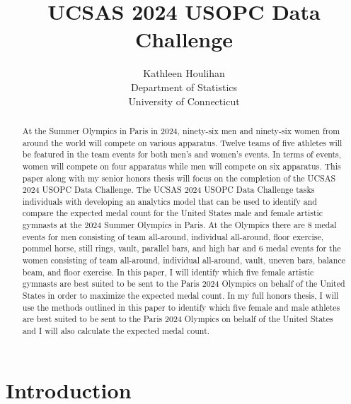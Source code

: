 \documentclass[12pt]{article}
\title{UCSAS 2024 USOPC Data Challenge}
\author{Kathleen Houlihan\\
  Department of Statistics\\
  University of Connecticut
}
\begin{document}
\maketitle

\begin{abstract}

 At the Summer Olympics in Paris in 2024, ninety-six men and ninety-six women 
 from around the world will compete on various apparatus. Twelve teams of five athletes will be 
 featured in the team events for both men's and women's events. In terms of events, women
 will compete on four apparatus while men will compete on six apparatus. This paper along 
 with my senior honors thesis will focus on the completion of the UCSAS 2024 USOPC Data Challenge. 
 The UCSAS 2024 USOPC Data Challenge tasks individuals with developing an analytics model that
 can be used to identify and compare the expected medal count for the United States male and 
 female artistic gymnasts at the 2024 Summer Olympics in Paris. At the Olympics there are 8 
 medal events for men consisting of team all-around, individual all-around, floor exercise, 
 pommel horse, still rings, vault, parallel bars, and high bar and 6 medal events for the women 
 consisting of team all-around, individual all-around, vault, uneven bars, balance beam, and 
 floor exercise. In this paper, I will identify which five female artistic gymnasts 
 are best suited to be sent to the Paris 2024 Olympics on behalf of the United States in order 
 to maximize the expected medal count. In my full honors thesis, I will use the methods outlined in this 
 paper to identify which five female and male athletes are best suited to be sent to the Paris 2024 
 Olympics on behalf of the United States and I will also calculate the expected medal count.

\end{abstract}

\section{Introduction}
\label{sec:intro}
\end{document}
